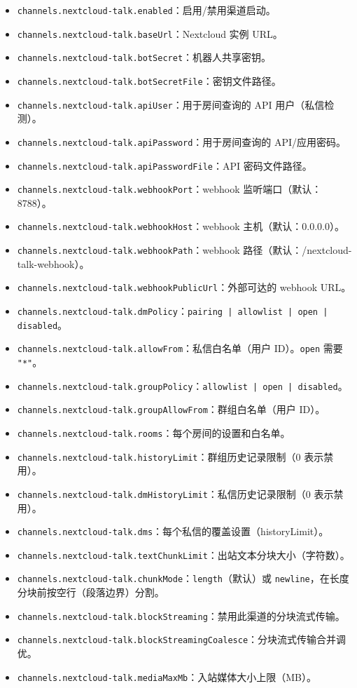 \begin{itemize}
  \item \texttt{channels.nextcloud-talk.enabled}：启用/禁用渠道启动。
  \item \texttt{channels.nextcloud-talk.baseUrl}：Nextcloud 实例 URL。
  \item \texttt{channels.nextcloud-talk.botSecret}：机器人共享密钥。
  \item \texttt{channels.nextcloud-talk.botSecretFile}：密钥文件路径。
  \item \texttt{channels.nextcloud-talk.apiUser}：用于房间查询的 API 用户（私信检测）。
  \item \texttt{channels.nextcloud-talk.apiPassword}：用于房间查询的 API/应用密码。
  \item \texttt{channels.nextcloud-talk.apiPasswordFile}：API 密码文件路径。
  \item \texttt{channels.nextcloud-talk.webhookPort}：webhook 监听端口（默认：8788）。
  \item \texttt{channels.nextcloud-talk.webhookHost}：webhook 主机（默认：0.0.0.0）。
  \item \texttt{channels.nextcloud-talk.webhookPath}：webhook 路径（默认：/nextcloud-talk-webhook）。
  \item \texttt{channels.nextcloud-talk.webhookPublicUrl}：外部可达的 webhook URL。
  \item \texttt{channels.nextcloud-talk.dmPolicy}：\texttt{pairing | allowlist | open | disabled}。
  \item \texttt{channels.nextcloud-talk.allowFrom}：私信白名单（用户 ID）。\texttt{open} 需要 \texttt{"*"}。
  \item \texttt{channels.nextcloud-talk.groupPolicy}：\texttt{allowlist | open | disabled}。
  \item \texttt{channels.nextcloud-talk.groupAllowFrom}：群组白名单（用户 ID）。
  \item \texttt{channels.nextcloud-talk.rooms}：每个房间的设置和白名单。
  \item \texttt{channels.nextcloud-talk.historyLimit}：群组历史记录限制（0 表示禁用）。
  \item \texttt{channels.nextcloud-talk.dmHistoryLimit}：私信历史记录限制（0 表示禁用）。
  \item \texttt{channels.nextcloud-talk.dms}：每个私信的覆盖设置（historyLimit）。
  \item \texttt{channels.nextcloud-talk.textChunkLimit}：出站文本分块大小（字符数）。
  \item \texttt{channels.nextcloud-talk.chunkMode}：\texttt{length}（默认）或 \texttt{newline}，在长度分块前按空行（段落边界）分割。
  \item \texttt{channels.nextcloud-talk.blockStreaming}：禁用此渠道的分块流式传输。
  \item \texttt{channels.nextcloud-talk.blockStreamingCoalesce}：分块流式传输合并调优。
  \item \texttt{channels.nextcloud-talk.mediaMaxMb}：入站媒体大小上限（MB）。
\end{itemize}



